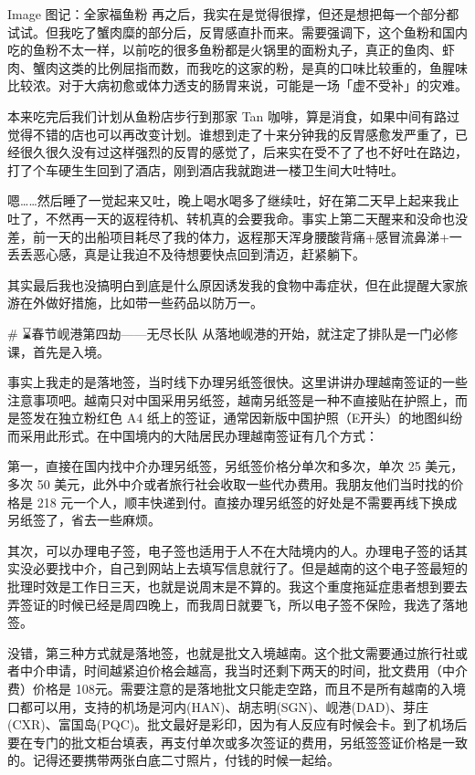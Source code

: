 Image
图记：全家福鱼粉
再之后，我实在是觉得很撑，但还是想把每一个部分都试试。但我吃了蟹肉糜的部分后，反胃感直扑而来。需要强调下，这个鱼粉和国内吃的鱼粉不太一样，以前吃的很多鱼粉都是火锅里的面粉丸子，真正的鱼肉、虾肉、蟹肉这类的比例屈指而数，而我吃的这家的粉，是真的口味比较重的，鱼腥味比较浓。对于大病初愈或体力透支的肠胃来说，可能是一场「虚不受补」的灾难。

本来吃完后我们计划从鱼粉店步行到那家 Tan 咖啡，算是消食，如果中间有路过觉得不错的店也可以再改变计划。谁想到走了十来分钟我的反胃感愈发严重了，已经很久很久没有过这样强烈的反胃的感觉了，后来实在受不了了也不好吐在路边，打了个车硬生生回到了酒店，刚到酒店我就跑进一楼卫生间大吐特吐。

嗯……然后睡了一觉起来又吐，晚上喝水喝多了继续吐，好在第二天早上起来我止吐了，不然再一天的返程待机、转机真的会要我命。事实上第二天醒来和没命也没差，前一天的出船项目耗尽了我的体力，返程那天浑身腰酸背痛+感冒流鼻涕+一丢丢恶心感，真是让我迫不及待想要快点回到清迈，赶紧躺下。

其实最后我也没搞明白到底是什么原因诱发我的食物中毒症状，但在此提醒大家旅游在外做好措施，比如带一些药品以防万一。

# ⌛️春节岘港第四劫——无尽长队
从落地岘港的开始，就注定了排队是一门必修课，首先是入境。

事实上我走的是落地签，当时线下办理另纸签很快。这里讲讲办理越南签证的一些注意事项吧。越南只对中国采用另纸签，越南另纸签是一种不直接贴在护照上，而是签发在独立粉红色 A4 纸上的签证，通常因新版中国护照（E开头）的地图纠纷而采用此形式。在中国境内的大陆居民办理越南签证有几个方式：

第一，直接在国内找中介办理另纸签，另纸签价格分单次和多次，单次 25 美元，多次 50 美元，此外中介或者旅行社会收取一些代办费用。我朋友他们当时找的价格是 218 元一个人，顺丰快递到付。直接办理另纸签的好处是不需要再线下换成另纸签了，省去一些麻烦。

其次，可以办理电子签，电子签也适用于人不在大陆境内的人。办理电子签的话其实没必要找中介，自己到网站上去填写信息就行了。但是越南的这个电子签最短的批理时效是工作日三天，也就是说周末是不算的。我这个重度拖延症患者想到要去弄签证的时候已经是周四晚上，而我周日就要飞，所以电子签不保险，我选了落地签。

没错，第三种方式就是落地签，也就是批文入境越南。这个批文需要通过旅行社或者中介申请，时间越紧迫价格会越高，我当时还剩下两天的时间，批文费用（中介费）价格是 108元。需要注意的是落地批文只能走空路，而且不是所有越南的入境口都可以用，支持的机场是河内(HAN)、胡志明(SGN)、岘港(DAD)、芽庄(CXR)、富国岛(PQC)。批文最好是彩印，因为有人反应有时候会卡。到了机场后要在专门的批文柜台填表，再支付单次或多次签证的费用，另纸签签证价格是一致的。记得还要携带两张白底二寸照片，付钱的时候一起给。

